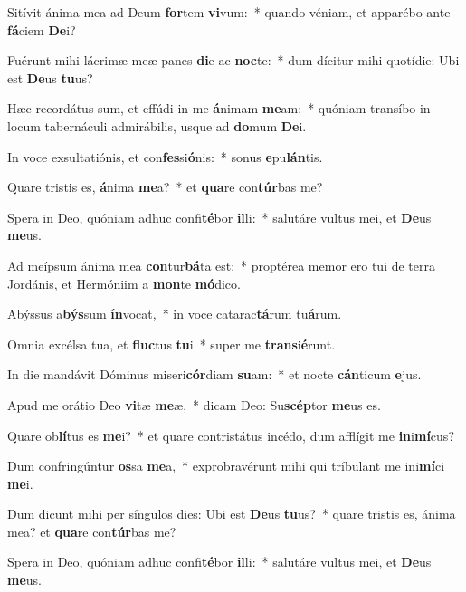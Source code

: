 \item Sitívit ánima mea ad Deum \textbf{for}tem \textbf{vi}vum:~* quando véniam, et apparébo ante \textbf{fá}ciem \textbf{De}i?
\item Fuérunt mihi lácrimæ meæ panes \textbf{di}e ac \textbf{noc}te:~* dum dícitur mihi quotídie: Ubi est \textbf{De}us \textbf{tu}us?
\item Hæc recordátus sum, et effúdi in me \textbf{á}nimam \textbf{me}am:~* quóniam transíbo in locum tabernáculi admirábilis, usque ad \textbf{do}mum \textbf{De}i.
\item In voce exsultatiónis, et con\textbf{fes}si\textbf{ó}nis:~* sonus \textbf{e}pu\textbf{lán}tis.
\item Quare tristis es, \textbf{á}nima \textbf{me}a?~* et \textbf{qua}re con\textbf{túr}bas me?
\item Spera in Deo, quóniam adhuc confi\textbf{té}bor \textbf{il}li:~* salutáre vultus mei, et \textbf{De}us \textbf{me}us.
\item Ad meípsum ánima mea \textbf{con}tur\textbf{bá}ta est:~* proptérea memor ero tui de terra Jordánis, et Hermóniim a \textbf{mon}te \textbf{mó}dico.
\item Abýssus a\textbf{býs}sum \textbf{ín}vocat,~* in voce catarac\textbf{tá}rum tu\textbf{á}rum.
\item Omnia excélsa tua, et \textbf{fluc}tus \textbf{tu}i~* super me \textbf{trans}i\textbf{é}runt.
\item In die mandávit Dóminus miseri\textbf{cór}diam \textbf{su}am:~* et nocte \textbf{cán}ticum \textbf{e}jus.
\item Apud me orátio Deo \textbf{vi}tæ \textbf{me}æ,~* dicam Deo: Su\textbf{scép}tor \textbf{me}us es.
\item Quare ob\textbf{lí}tus es \textbf{me}i?~* et quare contristátus incédo, dum afflígit me \textbf{in}i\textbf{mí}cus?
\item Dum confringúntur \textbf{os}sa \textbf{me}a,~* exprobravérunt mihi qui tríbulant me ini\textbf{mí}ci \textbf{me}i.
\item Dum dicunt mihi per síngulos dies: Ubi est \textbf{De}us \textbf{tu}us?~* quare tristis es, ánima mea? et \textbf{qua}re con\textbf{túr}bas me?
\item Spera in Deo, quóniam adhuc confi\textbf{té}bor \textbf{il}li:~* salutáre vultus mei, et \textbf{De}us \textbf{me}us.
